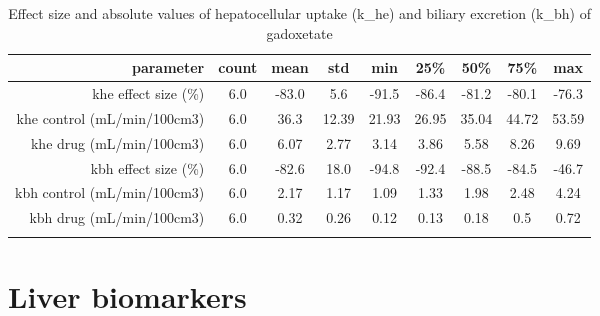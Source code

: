 \documentclass{epflreport}%
\begin{document}
%
\begin{longtable}{rcccccccc}%
\hline%
parameter&count&mean&std&min&25\%&50\%&75\%&max\\%
\hline%
khe effect size (\%)&6.0&{-}83.0&5.6&{-}91.5&{-}86.4&{-}81.2&{-}80.1&{-}76.3\\%
khe control (mL/min/100cm3)&6.0&36.3&12.39&21.93&26.95&35.04&44.72&53.59\\%
khe drug (mL/min/100cm3)&6.0&6.07&2.77&3.14&3.86&5.58&8.26&9.69\\%
kbh effect size (\%)&6.0&{-}82.6&18.0&{-}94.8&{-}92.4&{-}88.5&{-}84.5&{-}46.7\\%
kbh control (mL/min/100cm3)&6.0&2.17&1.17&1.09&1.33&1.98&2.48&4.24\\%
kbh drug (mL/min/100cm3)&6.0&0.32&0.26&0.12&0.13&0.18&0.5&0.72\\%
\hline%
\caption{Effect size and absolute values of hepatocellular uptake (k\_he) and biliary excretion (k\_bh) of gadoxetate} \\%
\end{longtable}%
\clearpage%
\section{Liver biomarkers}%
\label{sec:Liverbiomarkers}%
\end{document}
